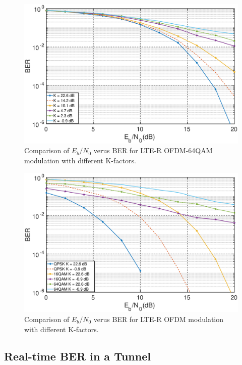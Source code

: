 \begin{figure}[!ht]
\label{64qam}
\centering
\includegraphics[width=\linewidth,keepaspectratio]{images/Gill/lte_figs/64qamricean.eps} 
\caption{Comparison of $E_b/N_0$ verus BER for LTE-R OFDM-64QAM modulation with different K-factors.}
\end{figure}

\begin{figure}[!ht]
\label{mqam}
\centering
\includegraphics[width=\linewidth,keepaspectratio]{images/Gill/lte_figs/mqamricean.eps} 
\caption{Comparison of $E_b/N_0$ verus BER for LTE-R OFDM modulation with different K-factors.}
\end{figure}


\subsection{Real-time BER in a Tunnel}


